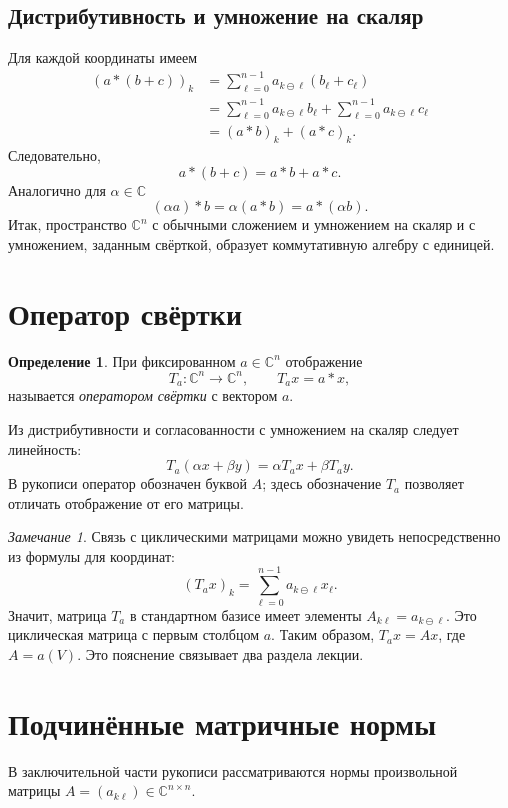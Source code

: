 \documentclass[12pt,a4paper]{article}
\theoremstyle{definition}
\newtheorem{definition}{Определение}
\theoremstyle{remark}
\newtheorem*{remark}{Замечание}
\newcommand{\CC}{\mathbb{C}}
\begin{document}
\subsection{Дистрибутивность и умножение на скаляр}

Для каждой координаты имеем
\begin{align*}
  (a*(b+c))_k
  &=\sum_{\ell=0}^{n-1}a_{k\ominus\ell}(b_\ell+c_\ell)\\
  &=\sum_{\ell=0}^{n-1}a_{k\ominus\ell}b_\ell
    +\sum_{\ell=0}^{n-1}a_{k\ominus\ell}c_\ell\\
  &=(a*b)_k+(a*c)_k.
\end{align*}
Следовательно,
\[
  a*(b+c)=a*b+a*c.
\]
Аналогично для $\alpha\in\CC$
\[
  (\alpha a)*b=\alpha(a*b)=a*(\alpha b).
\]
Итак, пространство $\CC^n$ с обычными сложением и умножением на скаляр
и с умножением, заданным свёрткой, образует коммутативную алгебру с единицей.

\section{Оператор свёртки}

\begin{definition}
При фиксированном $a\in\CC^n$ отображение
\[
  T_a\colon\CC^n\longrightarrow\CC^n,\qquad T_ax=a*x,
\]
называется \emph{оператором свёртки} с вектором $a$.
\end{definition}

Из дистрибутивности и согласованности с умножением на скаляр следует
линейность:
\[
  T_a(\alpha x+\beta y)=\alpha T_ax+\beta T_ay.
\]
В рукописи оператор обозначен буквой $A$; здесь обозначение $T_a$
позволяет отличать отображение от его матрицы.

\begin{remark}
Связь с циклическими матрицами можно увидеть непосредственно из формулы
для координат:
\[
  (T_ax)_k=\sum_{\ell=0}^{n-1}a_{k\ominus\ell}x_\ell.
\]
Значит, матрица $T_a$ в стандартном базисе имеет элементы
$A_{k\ell}=a_{k\ominus\ell}$. Это циклическая матрица с первым столбцом
$a$. Таким образом, $T_ax=Ax$, где $A=a(V)$. Это пояснение связывает два
раздела лекции.
\end{remark}

\section{Подчинённые матричные нормы}

В заключительной части рукописи рассматриваются нормы произвольной
матрицы $A=(a_{k\ell})\in\CC^{n\times n}$.
\end{document}
